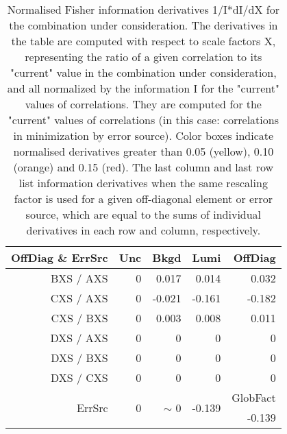 \begin{table}[H]
\scriptsize
\begin{center}
\renewcommand{\arraystretch}{1.1}
\begin{tabular}{|r|rrr|r|}
\hline
 OffDiag \& ErrSrc & {\tiny Unc} & {\tiny Bkgd} & {\tiny Lumi} & OffDiag\\
\hline
BXS / AXS &  0 &      0.017 &      0.014 &      0.032 \\
CXS / AXS &  0 &     -0.021 &     -0.161 &     -0.182 \\
CXS / BXS &  0 &      0.003 &      0.008 &      0.011 \\
DXS / AXS &  0 &  0 &  0 &  0 \\
DXS / BXS &  0 &  0 &  0 &  0 \\
DXS / CXS &  0 &  0 &  0 &  0 \\
\hline
\multirow{2}{*}{ErrSrc} & \multirow{2}{*}{ 0} & \multirow{2}{*}{ {\tiny $\sim$ }0} & \multirow{2}{*}{    -0.139} & GlobFact\\
 & & & &     -0.139 \\
\hline
\end{tabular}
\renewcommand{\arraystretch}{1}
\caption{Normalised Fisher information derivatives 1/I*dI/dX for the combination under consideration. The derivatives in the table are computed with respect to scale factors X, representing the ratio of a given correlation to its "current" value in the combination under consideration, and all normalized by the information I for the "current" values of correlations. They are computed for the "current" values of correlations (in this case: correlations in minimization by error source). Color boxes indicate normalised derivatives greater than 0.05 (yellow), 0.10 (orange) and 0.15 (red). The last column and last row list information derivatives when the same rescaling factor is used for a given off-diagonal element or error source, which are equal to the sums of individual derivatives in each row and column, respectively.}
\end{center}
\end{table}
